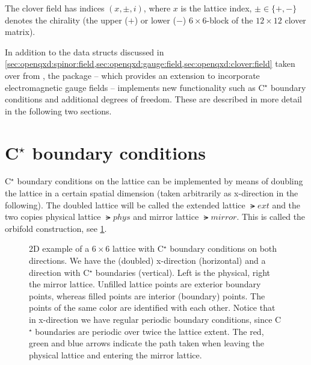 The clover field has indices $(x, \pm, i)$, where $x$ is the lattice index, $\pm \in \{+, -\}$ denotes the chirality (\ie the upper ($+$) or lower ($-$) $6 \times 6$-block of the $12 \times 12$ clover matrix).



In addition to the data structs discussed in \cref{sec:openqxd:spinor:field,sec:openqxd:gauge:field,sec:openqxd:clover:field} taken over from \openqcd, the \openqxd package -- which provides an extension to incorporate electromagnetic gauge fields -- implements new functionality such as C$^\star$ boundary conditions and additional degrees of freedom.
These are described in more detail in the following two sections.

\section{C\texorpdfstring{$^{\star}$}{*} boundary conditions}
\label{sec:openqxd:cstar}

C$^{\star}$ boundary conditions on the lattice can be implemented by means of doubling the lattice in a certain spatial dimension (taken arbitrarily as x-direction in the following).
The doubled lattice will be called the extended lattice $\lat{ext}$ and the two copies physical lattice $\lat{phys}$ and mirror lattice $\lat{mirror}$.
This is called the orbifold construction, see \cref{fig:cstar:orbi}.
\begin{figure}
  
  \caption{2D example of a $6 \times 6$ lattice with C$^\star$ boundary conditions on both directions. We have the (doubled) x-direction (horizontal) and a direction with C$^\star$ boundaries (vertical). Left is the physical, right the mirror lattice. Unfilled lattice points are exterior boundary points, whereas filled points are interior (boundary) points. The points of the same color are identified with each other. Notice that in x-direction we have regular periodic boundary conditions, since C$^\star$ boundaries are periodic over twice the lattice extent. The red, green and blue arrows indicate the path taken when leaving the physical lattice and entering the mirror lattice.}
  \label{fig:cstar:orbi}
\end{figure}

